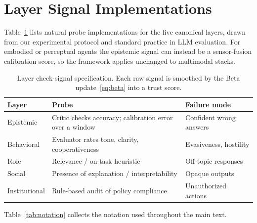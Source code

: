 \documentclass[sigconf,anonymous]{acmart}
\theoremstyle{plain}
\theoremstyle{definition}
\theoremstyle{remark}
\begin{document}
\section{Layer Signal Implementations}
\label{app:signals}
Table~\ref{tab:signals} lists natural probe implementations for the five canonical
layers, drawn from our experimental protocol and standard practice in LLM evaluation. For
embodied or perceptual agents the epistemic signal can instead be a sensor-fusion
calibration score, so the framework applies unchanged to multimodal stacks.

\begin{table}[h]
\caption{Layer check-signal specification. Each raw signal is smoothed by the Beta
update~\eqref{eq:beta} into a trust score.}
\label{tab:signals}
\centering\footnotesize\renewcommand{\arraystretch}{1.3}
\begin{tabular}{p{1.4cm} p{3.0cm} p{2.4cm}}
\toprule
\rowcolor{headrow}
{\color{white}\textbf{Layer}} & {\color{white}\textbf{Probe}} &
{\color{white}\textbf{Failure mode}} \\
\midrule
Epistemic & Critic checks accuracy; calibration error over a window & Confident wrong answers \\
Behavioral & Evaluator rates tone, clarity, cooperativeness & Evasiveness, hostility \\
Role & Relevance / on-task heuristic & Off-topic responses \\
Social & Presence of explanation / interpretability & Opaque outputs \\
Institutional & Rule-based audit of policy compliance & Unauthorized actions \\
\bottomrule
\end{tabular}
\end{table}

Table~\ref{tab:notation} collects the notation used throughout the main text.
\end{document}
